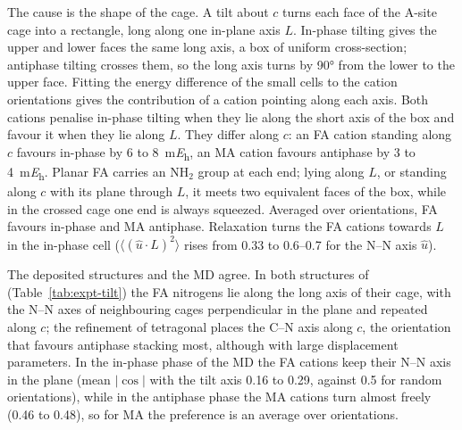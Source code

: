 {The cause is the shape of the cage. A tilt about $c$ turns each face of the A-site cage into a rectangle, long along
one in-plane axis $L$. In-phase tilting gives the upper and lower faces the same long axis, a box of uniform
cross-section; antiphase tilting crosses them, so the long axis turns by \ang{90} from the lower to the upper face.
Fitting the energy difference of the small cells to the cation orientations gives the contribution of a cation
pointing along each axis. Both cations penalise in-phase tilting when they lie along the short axis of the box and
favour it when they lie along $L$. They differ along $c$: an FA cation standing along $c$ favours in-phase by 6 to
\SI{8}{\milli\hartree}, an MA cation favours antiphase by 3 to \SI{4}{\milli\hartree}. Planar FA carries an NH$_2$
group at each end; lying along $L$, or standing along $c$ with its plane through $L$, it meets two equivalent faces of
the box, while in the crossed cage one end is always squeezed. Averaged over orientations, FA favours in-phase and MA
antiphase. Relaxation turns the FA cations towards $L$ in the in-phase cell ($\langle (\hat u\cdot L)^2\rangle$ rises
from 0.33 to 0.6--0.7 for the N--N axis $\hat u$).

The deposited structures and the MD agree. In both structures of \FASnI{} (Table~\ref{tab:expt-tilt}) the FA
nitrogens lie along the long axis of their cage, with the N--N axes of neighbouring cages perpendicular in the plane and
repeated along $c$;\cite{Kahmann2020ACSEL} the refinement of tetragonal \MASnI{} places the C--N axis along
$c$,\cite{stoumpos2013semiconducting} the orientation that favours antiphase stacking most, although with large
displacement parameters. In the in-phase phase of the MD the FA cations keep their N--N axis in the plane (mean
$|\cos|$ with the tilt axis 0.16 to 0.29, against 0.5 for random orientations), while in the antiphase phase the MA
cations turn almost freely (0.46 to 0.48), so for MA the preference is an average over orientations.
}
